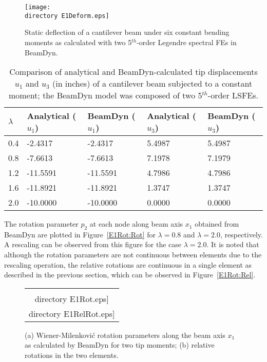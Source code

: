 \begin{figure}
    \centering
    \texttt{[image: \\directory E1Deform.eps]}

    \caption{Static deflection of a cantilever beam under six constant
bending moments as calculated with two 5$^{th}$-order Legendre spectral
FEs in BeamDyn.}

    \label{E1Deform}
\end{figure}

\begin{table}[tbp]
\centering \caption{Comparison of analytical and BeamDyn-calculated tip
displacements $u_1$ and $u_3$ (in inches) of a cantilever beam subjected to a constant moment; the BeamDyn model was composed of two 5$^{th}$-order LSFEs.}
\label{E1u} 
	\begin{tabular}{| l | l | l | l | l | }
    	\hline
    	$\lambda$ & Analytical ($u_1$) & BeamDyn ($u_1$) & Analytical ($u_3$) & BeamDyn ($u_3$)  
	\\ \hline
    	0.4       & -2.4317    & -2.4317  & 5.4987     & 5.4987
	\\ \hline
    	0.8       & -7.6613    & -7.6613  & 7.1978     & 7.1979
	\\ \hline
    	1.2       & -11.5591   & -11.5591 & 4.7986     & 4.7986
	\\ \hline
    	1.6       & -11.8921   & -11.8921 & 1.3747     & 1.3747
	\\ \hline
    	2.0       & -10.0000   & -10.0000 & 0.0000     & 0.0000
	\\ \hline
    \end{tabular}
\end{table}

The rotation parameter $p_2$ at each node along beam axis $x_1$ obtained
from BeamDyn are plotted in Figure~\ref{E1Rot:Rot} for $\lambda = 0.8$ and
$\lambda = 2.0$, respectively. A rescaling can be observed from this figure
for the case $\lambda = 2.0$. It is noted that although the rotation
parameters are not continuous between elements due to the rescaling
operation, the relative rotations are continuous in a single element as
described in the previous section, which can be observed in
Figure~\ref{E1Rot:Rel}.  
\begin{figure}
    \centering
    \begin{tabular}{c}
    \subfloat[Rotation parameter $p_2$]{\label{E1Rot:Rot}\texttt{[image: \\directory E1Rot.eps]}} \qquad 
    \subfloat[Relative rotation $r_2$]{\label{E1Rot:Rel}\texttt{[image: \\directory E1RelRot.eps]}} 
    \end{tabular}
    \caption{(a) Wiener-Milenkovi\'c rotation parameters along the beam axis
$x_1$ as calculated by BeamDyn for two tip moments; (b) relative rotations
in the two elements.}
    \label{E1Rot}
\end{figure}

